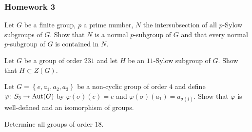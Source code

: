 \subsubsection{Homework 3}
\setcounter{exercise}{0}
\setcounter{equation}{0}

\begin{problem}
  Let $G$ be a finite group, $p$ a prime number, $N$ the intersubsection of
  all $p$-Sylow subgroups of $G$. Show that $N$ is a normal $p$-subgroup of
  $G$ and that every normal $p$-subgroup of $G$ is contained in $N$.
\end{problem}
\begin{solution}
\end{solution}

\begin{problem}
  Let $G$ be a group of order $231$ and let $H$ be an $11$-Sylow subgroup
  of $G$. Show that $H\subset Z(G)$.
\end{problem}
\begin{solution}
\end{solution}

\begin{problem}
  Let $G=\left\{e,a_1,a_2,a_3\right\}$ be a non-cyclic group of order $4$
  and define $\varphi\colon S_3\to\operatorname{Aut}(G)$ by $\varphi(\sigma)(e)=e$ and
  $\varphi(\sigma)(a_1)=a_{\sigma(i)}$. Show that $\varphi$ is well-defined
  and an isomorphism of groups.
\end{problem}
\begin{solution}
\end{solution}

\begin{problem}
  Determine all groups of order $18$.
\end{problem}
\begin{solution}
\end{solution}

